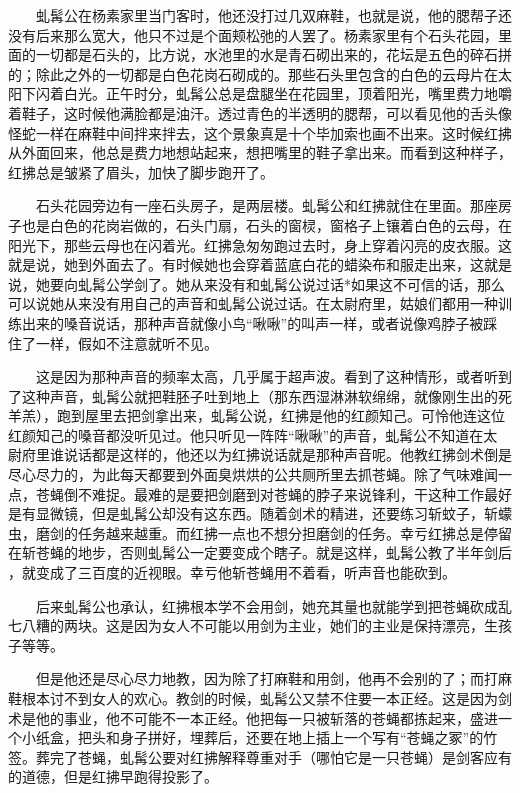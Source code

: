 　　虬髯公在杨素家里当门客时，他还没打过几双麻鞋，也就是说，他的腮帮子还 没有后来那么宽大，他只不过是个面颊松弛的人罢了。杨素家里有个石头花园，里 面的一切都是石头的，比方说，水池里的水是青石砌出来的，花坛是五色的碎石拼 的；除此之外的一切都是白色花岗石砌成的。那些石头里包含的白色的云母片在太 阳下闪着白光。正午时分，虬髯公总是盘腿坐在花园里，顶着阳光，嘴里费力地嚼 着鞋子，这时候他满脸都是油汗。透过青色的半透明的腮帮，可以看见他的舌头像 怪蛇一样在麻鞋中间拌来拌去，这个景象真是十个毕加索也画不出来。这时候红拂 从外面回来，他总是费力地想站起来，想把嘴里的鞋子拿出来。而看到这种样子， 红拂总是皱紧了眉头，加快了脚步跑开了。

 　　石头花园旁边有一座石头房子，是两层楼。虬髯公和红拂就住在里面。那座房 子也是白色的花岗岩做的，石头门扇，石头的窗棂，窗格子上镶着白色的云母，在 阳光下，那些云母也在闪着光。红拂急匆匆跑过去时，身上穿着闪亮的皮衣服。这 就是说，她到外面去了。有时候她也会穿着蓝底白花的蜡染布和服走出来，这就是 说，她要向虬髯公学剑了。她从来没有和虬髯公说过话*如果这不可信的话，那么 可以说她从来没有用自己的声音和虬髯公说过话。在太尉府里，姑娘们都用一种训 练出来的嗓音说话，那种声音就像小鸟“啾啾”的叫声一样，或者说像鸡脖子被踩 住了一样，假如不注意就听不见。 

　　这是因为那种声音的频率太高，几乎属于超声波。看到了这种情形，或者听到 了这种声音，虬髯公就把鞋胚子吐到地上（那东西湿淋淋软绵绵，就像刚生出的死 羊羔），跑到屋里去把剑拿出来，虬髯公说，红拂是他的红颜知己。可怜他连这位 红颜知己的嗓音都没听见过。他只听见一阵阵“啾啾”的声音，虬髯公不知道在太 尉府里谁说话都是这样的，他还以为红拂说话就是那种声音呢。他教红拂剑术倒是 尽心尽力的，为此每天都要到外面臭烘烘的公共厕所里去抓苍蝇。除了气味难闻一 点，苍蝇倒不难捉。最难的是要把剑磨到对苍蝇的脖子来说锋利，干这种工作最好 是有显微镜，但是虬髯公却没有这东西。随着剑术的精进，还要练习斩蚊子，斩蠓 虫，磨剑的任务越来越重。而红拂一点也不想分担磨剑的任务。幸亏红拂总是停留 在斩苍蝇的地步，否则虬髯公一定要变成个瞎子。就是这样，虬髯公教了半年剑后 ，就变成了三百度的近视眼。幸亏他斩苍蝇用不着看，听声音也能砍到。

 　　后来虬髯公也承认，红拂根本学不会用剑，她充其量也就能学到把苍蝇砍成乱 七八糟的两块。这是因为女人不可能以用剑为主业，她们的主业是保持漂亮，生孩 子等等。

 　　但是他还是尽心尽力地教，因为除了打麻鞋和用剑，他再不会别的了；而打麻 鞋根本讨不到女人的欢心。教剑的时候，虬髯公又禁不住要一本正经。这是因为剑 术是他的事业，他不可能不一本正经。他把每一只被斩落的苍蝇都拣起来，盛进一 个小纸盒，把头和身子拼好，埋葬后，还要在地上插上一个写有“苍蝇之冢”的竹 签。葬完了苍蝇，虬髯公要对红拂解释尊重对手（哪怕它是一只苍蝇）是剑客应有 的道德，但是红拂早跑得投影了。 

